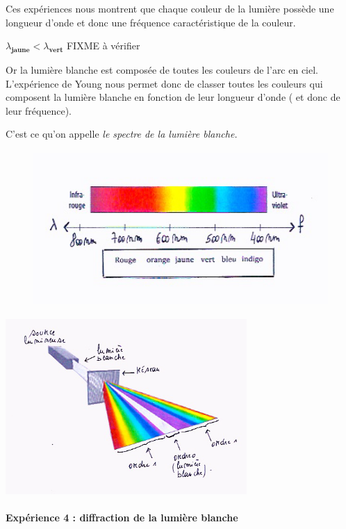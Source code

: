 Ces expériences nous montrent que chaque couleur de la
lumière possède une longueur d'onde et donc une fréquence
caractéristique de la couleur.

$\lambda_\textbf{jaune} < \lambda_\textbf{vert}$ FIXME à vérifier

Or la lumière blanche est composée de toutes les couleurs de l'arc en
ciel. L'expérience de Young nous permet donc de classer toutes les
couleurs qui composent la lumière blanche en fonction de leur longueur
d'onde ( et donc de leur fréquence).

C'est ce qu'on appelle \emph{le spectre de la lumière blanche.} %

\begin{figure}
\centering
\includegraphics[width=11.557cm,height=5.907cm]{Pictures/1000000100000186000000C7B42157D8D8096212.png}
\caption{}
\end{figure}

\includegraphics[width=9.176cm,height=6.676cm]{Pictures/10000001000001FB0000017167AEF9D1A02E0A78.png}

\paragraph{Expérience 4 : diffraction de la lumière blanche}

